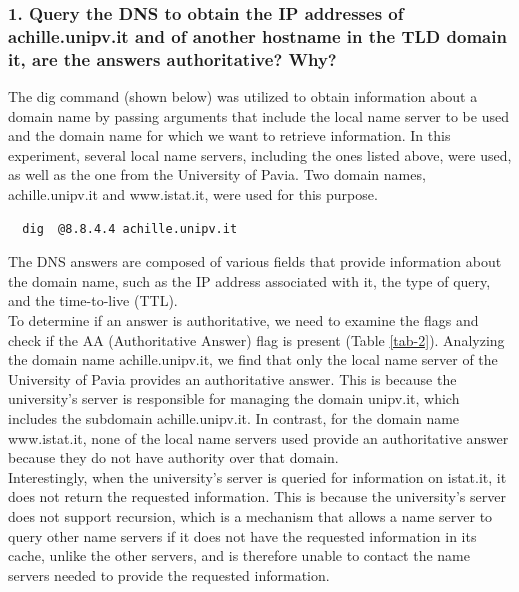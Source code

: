 \documentclass[eng]{class}
\begin{document}
\subsubsection*{1. Query the DNS to obtain the IP addresses of achille.unipv.it and of another hostname in the TLD domain it, are the answers authoritative? Why?}
The dig command (shown below) was utilized to obtain information about a domain name by passing arguments that include the local name server
to be used and the domain name for which we want to retrieve information.
In this experiment, several local name servers, including the ones listed above, were used, as well as the one from the University of Pavia.
Two domain names, achille.unipv.it and www.istat.it, were used for this purpose.
\begin{lstlisting}
  dig  @8.8.4.4 achille.unipv.it
\end{lstlisting}
The DNS answers are composed of various fields that provide information about the domain name, such as the IP address associated with it,
the type of query, and the time-to-live (TTL). \\
To determine if an answer is authoritative, we need to examine the flags and check if the AA (Authoritative Answer) flag is present (Table \ref*{tab-2}).
Analyzing the domain name achille.unipv.it, we find that only the local name server of the University of Pavia provides an authoritative answer.
This is because the university's server is responsible for managing the domain unipv.it, which includes the subdomain achille.unipv.it.
In contrast, for the domain name www.istat.it, none of the local name servers used provide an authoritative answer because they do not have authority over that domain.\\
Interestingly, when the university's server is queried for information on istat.it, it does not return the requested information.
This is because the university's server does not support recursion, which  is a mechanism that allows a name server to query other name servers if it does not have the requested information in its cache, unlike the other servers,
and is therefore unable to contact the name servers needed to provide the requested information.
\end{document}
